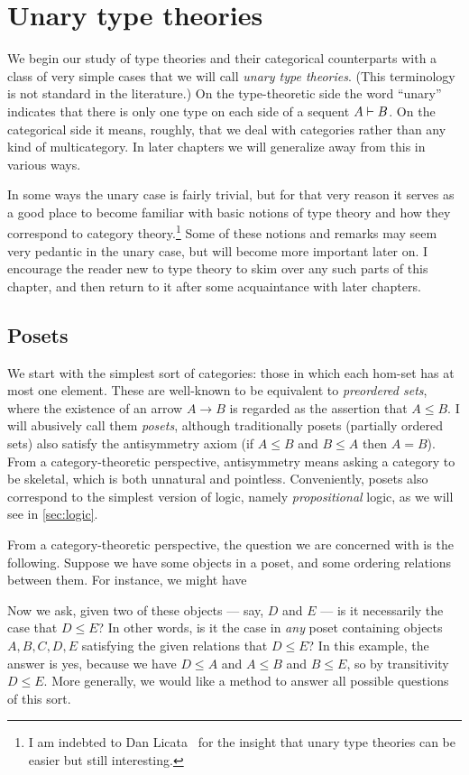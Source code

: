 \chapter{Unary type theories}
\label{chap:unary}

We begin our study of type theories and their categorical counterparts with a class of very simple cases that we will call \emph{unary type theories}.
(This terminology is not standard in the literature.)
On the type-theoretic side the word ``unary'' indicates that there is only one type on each side of a sequent $A\vdash B$.
On the categorical side it means, roughly, that we deal with categories rather than any kind of multicategory.
In later chapters we will generalize away from this in various ways.

In some ways the unary case is fairly trivial, but for that very reason it serves as a good place to become familiar with basic notions of type theory and how they correspond to category theory.\footnote{I am indebted to Dan Licata~\cite{ls:1var-adjoint-logic} for the insight that unary type theories can be easier but still interesting.}
Some of these notions and remarks may seem very pedantic in the unary case, but will become more important later on.
I encourage the reader new to type theory to skim over any such parts of this chapter, and then return to it after some acquaintance with later chapters.


\section{Posets}
\label{sec:poset}

We start with the simplest sort of categories: those in which each hom-set has at most one element.
These are well-known to be equivalent to \emph{preordered sets}, where the existence of an arrow $A\to B$ is regarded as the assertion that $A\le B$.
I will abusively call them \emph{posets}, although traditionally posets (partially ordered sets) also satisfy the antisymmetry axiom (if $A\le B$ and $B\le A$ then $A=B$).
From a category-theoretic perspective, antisymmetry means asking a category to be skeletal, which is both unnatural and pointless.
Conveniently, posets also correspond to the simplest version of logic, namely \emph{propositional} logic, as we will see in \cref{sec:logic}.

From a category-theoretic perspective, the question we are concerned with is the following.
Suppose we have some objects in a poset, and some ordering relations between them.
For instance, we might have
Now we ask, given two of these objects --- say, $D$ and $E$ --- is it necessarily the case that $D\le E$?
In other words, is it the case in \emph{any} poset containing objects $A,B,C,D,E$ satisfying the given relations that $D\le E$?
In this example, the answer is yes, because we have $D\le A$ and  $A\le B$ and $B\le E$, so by transitivity $D\le E$.
More generally, we would like a method to answer all possible questions of this sort.


